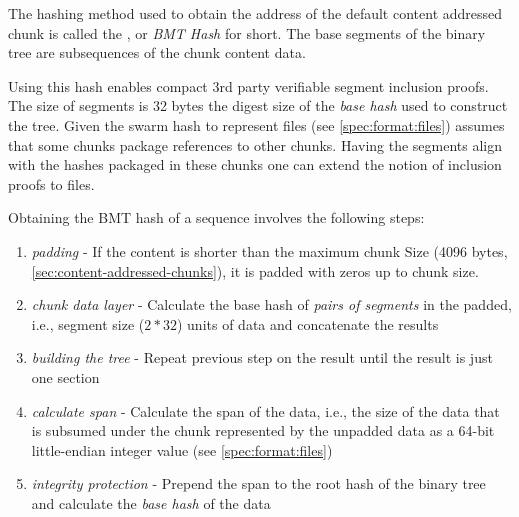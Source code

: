 The hashing method used to obtain the address of the default content addressed chunk is called the , or \emph{BMT Hash} for short. The base segments of the binary tree are subsequences of the chunk content data. 

Using this hash enables compact 3rd  party verifiable segment inclusion proofs.
The size of segments is 32  bytes the digest size of the \emph{base hash} used to construct the tree. 
Given the swarm hash to represent files (see \ref{spec:format:files}) assumes that some chunks package references to other chunks. Having the segments align with the hashes packaged in these chunks one can extend the notion of inclusion proofs to files. 

Obtaining the BMT hash of a sequence involves the following steps:

\begin{enumerate}
\item \emph{padding} - If the content is shorter than the maximum chunk Size  (4096 bytes, \ref{sec:content-addressed-chunks}), it is padded with zeros up to chunk size.
\item \emph{chunk data layer} - Calculate the base hash of \emph{pairs of segments} in the padded, i.e., segment size ($2 * 32$) units of data and concatenate the results
\item \emph{building the tree} - Repeat previous step on the result until the result is just one section
\item \emph{calculate span} - Calculate the span of the data, i.e., the size of the data that is subsumed under the chunk represented by the unpadded data as a 64-bit little-endian integer value (see  \ref{spec:format:files})
\item \emph{integrity protection} - Prepend the span to the root hash of the binary tree and calculate the \emph{base hash} of the data
\end{enumerate}

